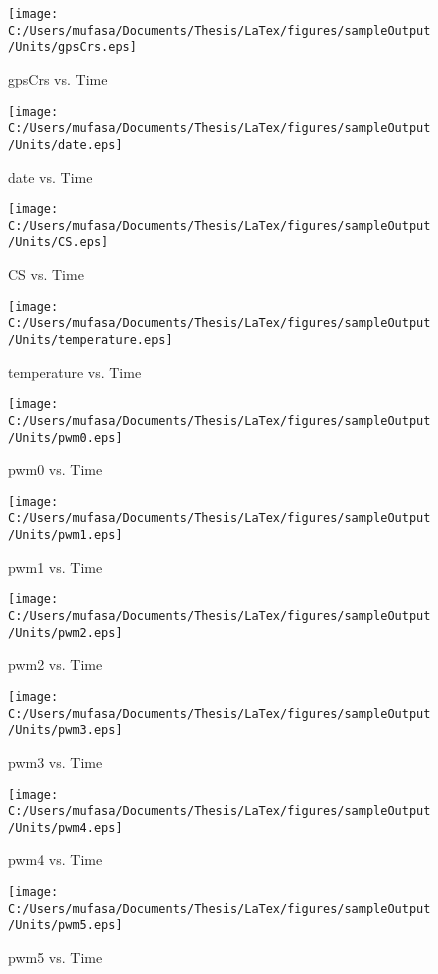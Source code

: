 \begin{figure}[H]
	\centering
	\caption{gpsCrs vs. Time}
		\texttt{[image: C:/Users/mufasa/Documents/Thesis/LaTex/figures/sampleOutput/Units/gpsCrs.eps]}
\end{figure}
\begin{figure}[H]
	\centering
	\caption{date vs. Time}
		\texttt{[image: C:/Users/mufasa/Documents/Thesis/LaTex/figures/sampleOutput/Units/date.eps]}
\end{figure}
\begin{figure}[H]
	\centering
	\caption{CS vs. Time}
		\texttt{[image: C:/Users/mufasa/Documents/Thesis/LaTex/figures/sampleOutput/Units/CS.eps]}
\end{figure}
\begin{figure}[H]
	\centering
	\caption{temperature vs. Time}
		\texttt{[image: C:/Users/mufasa/Documents/Thesis/LaTex/figures/sampleOutput/Units/temperature.eps]}
\end{figure}
\begin{figure}[H]
	\centering
	\caption{pwm0 vs. Time}
		\texttt{[image: C:/Users/mufasa/Documents/Thesis/LaTex/figures/sampleOutput/Units/pwm0.eps]}
\end{figure}
\begin{figure}[H]
	\centering
	\caption{pwm1 vs. Time}
		\texttt{[image: C:/Users/mufasa/Documents/Thesis/LaTex/figures/sampleOutput/Units/pwm1.eps]}
\end{figure}
\begin{figure}[H]
	\centering
	\caption{pwm2 vs. Time}
		\texttt{[image: C:/Users/mufasa/Documents/Thesis/LaTex/figures/sampleOutput/Units/pwm2.eps]}
\end{figure}
\begin{figure}[H]
	\centering
	\caption{pwm3 vs. Time}
		\texttt{[image: C:/Users/mufasa/Documents/Thesis/LaTex/figures/sampleOutput/Units/pwm3.eps]}
\end{figure}
\begin{figure}[H]
	\centering
	\caption{pwm4 vs. Time}
		\texttt{[image: C:/Users/mufasa/Documents/Thesis/LaTex/figures/sampleOutput/Units/pwm4.eps]}
\end{figure}
\begin{figure}[H]
	\centering
	\caption{pwm5 vs. Time}
		\texttt{[image: C:/Users/mufasa/Documents/Thesis/LaTex/figures/sampleOutput/Units/pwm5.eps]}
\end{figure}
